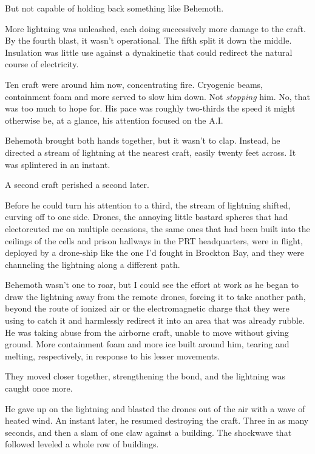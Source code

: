 But not capable of holding back something like Behemoth.



More lightning was unleashed, each doing successively more damage to the craft.  By the fourth blast, it wasn't operational.  The fifth split it down the middle.  Insulation was little use against a dynakinetic that could redirect the natural course of electricity.



Ten craft were around him now, concentrating fire.  Cryogenic beams, containment foam and more served to slow him down.  Not \emph{stopping }him.  No, that was too much to hope for.  His pace was roughly two-thirds the speed it might otherwise be, at a glance, his attention focused on the A.I.



Behemoth brought both hands together, but it wasn't to clap.  Instead, he directed a stream of lightning at the nearest craft, easily twenty feet across.  It was splintered in an instant.



A second craft perished a second later.



Before he could turn his attention to a third, the stream of lightning shifted, curving off to one side.  Drones, the annoying little bastard spheres that had electorcuted me on multiple occasions, the same ones that had been built into the ceilings of the cells and prison hallways in the PRT headquarters, were in flight, deployed by a drone-ship like the one I'd fought in Brockton Bay, and they were channeling the lightning along a different path.



Behemoth wasn't one to roar, but I could see the effort at work as he began to draw the lightning away from the remote drones, forcing it to take another path, beyond the route of ionized air or the electromagnetic charge that they were using to catch it and harmlessly redirect it into an area that was already rubble.  He was taking abuse from the airborne craft, unable to move without giving ground.  More containment foam and more ice built around him, tearing and melting, respectively, in response to his lesser movements.



They moved closer together, strengthening the bond, and the lightning was caught once more.



He gave up on the lightning and blasted the drones out of the air with a wave of heated wind.  An instant later, he resumed destroying the craft.  Three in as many seconds, and then a slam of one claw against a building.  The shockwave that followed leveled a whole row of buildings.



